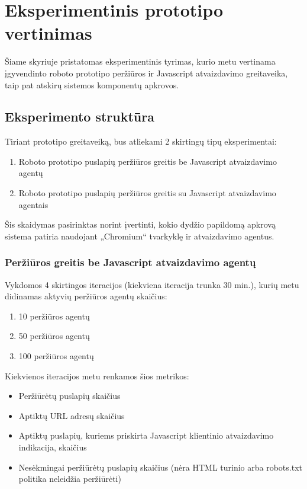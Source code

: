 \section{Eksperimentinis prototipo vertinimas}

Šiame skyriuje pristatomas eksperimentinis tyrimas, kurio metu vertinama įgyvendinto roboto prototipo peržiūros ir Javascript atvaizdavimo greitaveika, taip pat atskirų sistemos komponentų apkrovos.

\subsection{Eksperimento struktūra}

Tiriant prototipo greitaveiką, bus atliekami 2 skirtingų tipų eksperimentai:

\begin{enumerate}
    \item Roboto prototipo puslapių peržiūros greitis be Javascript atvaizdavimo agentų
    \item Roboto prototipo puslapių peržiūros greitis su Javascript atvaizdavimo agentais
\end{enumerate}

Šis skaidymas pasirinktas norint įvertinti, kokio dydžio papildomą apkrovą sistema patiria naudojant „Chromium“ tvarkyklę ir atvaizdavimo agentus.

\subsubsection{Peržiūros greitis be Javascript atvaizdavimo agentų}

Vykdomos 4 skirtingos iteracijos (kiekviena iteracija trunka 30 min.), kurių metu didinamas aktyvių peržiūros agentų skaičius:

\begin{enumerate}
    \item 10 peržiūros agentų
    \item 50 peržiūros agentų
    \item 100 peržiūros agentų
\end{enumerate}

Kiekvienos iteracijos metu renkamos šios metrikos:

\begin{itemize}
    \item Peržiūrėtų puslapių skaičius
    \item Aptiktų URL adresų skaičius
    \item Aptiktų puslapių, kuriems priskirta Javascript klientinio atvaizdavimo indikacija, skaičius
    \item Nesėkmingai peržiūrėtų puslapių skaičius (nėra HTML turinio arba robots.txt politika neleidžia peržiūrėti)
\end{itemize}

